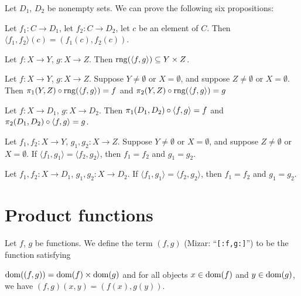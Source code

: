 \documentclass{article}
\begin{document}
Let $D_{1}$, $D_{2}$ be nonempty sets.
We can prove the following six propositions:
\begin{thm}
\item\label{funct3:59} Let $f_{1}\colon C\to D_{1}$,
  let $f_{2}\colon C\to D_{2}$, let $c$ be an element of $C$.
  Then $\langle f_{1},f_{2}\rangle(c)=(f_{1}(c),f_{2}(c))$.
\item\label{funct3:60} Let $f\colon X\to Y$, $g\colon X\to Z$.
  Then $\operatorname{rng}(\langle f,g\rangle)\subseteq Y\times Z$.
\item\label{funct3:61} Let $f\colon X\to Y$, $g\colon X\to Z$.
  Suppose $Y\neq\emptyset$ or $X=\emptyset$, and suppose
  $Z\neq\emptyset$ or $X=\emptyset$.
  Then $\pi_{1}(Y, Z)\circ\operatorname{rng}(\langle f,g\rangle)=f$
  and $\pi_{2}(Y, Z)\circ\operatorname{rng}(\langle f,g\rangle)=g$
\item\label{funct3:62} Let $f\colon X\to D_{1}$,
  $g\colon X\to D_{2}$.
  Then $\pi_{1}(D_{1}, D_{2})\circ\langle f,g\rangle = f$ and
  $\pi_{2}(D_{1}, D_{2})\circ\langle f,g\rangle = g$.
\item\label{funct3:63} Let $f_{1},f_{2}\colon X\to Y$, $g_{1},g_{2}\colon X\to Z$.
  Suppose $Y\neq\emptyset$ or $X=\emptyset$, and suppose
  $Z\neq\emptyset$ or $X=\emptyset$.
  If $\langle f_{1},g_{1}\rangle = \langle f_{2},g_{2}\rangle$,
  then $f_{1} = f_{2}$ and $g_{1} = g_{2}$.
\item\label{funct3:64} Let $f_{1},f_{2}\colon X\to D_{1}$,
  $g_{1},g_{2}\colon X\to D_{2}$.
  If $\langle f_{1},g_{1}\rangle = \langle f_{2},g_{2}\rangle$,
  then $f_{1} = f_{2}$ and $g_{1} = g_{2}$.
\end{thm}

\section{Product functions}

\begin{definition}
Let $f$, $g$ be functions.
We define the term $(f,g)$ (Mizar: ``\verb#[:f,g:]#'')
to be the function satisfying
\begin{defn}
\item $\operatorname{dom}((f,g))=\operatorname{dom}(f)\times\operatorname{dom}(g)$ and for all objects
  $x\in\operatorname{dom}(f)$ and $y\in\operatorname{dom}(g)$, we have $(f,g)(x,y)=(f(x),g(y))$.
\end{defn}
\end{definition}
\end{document}
